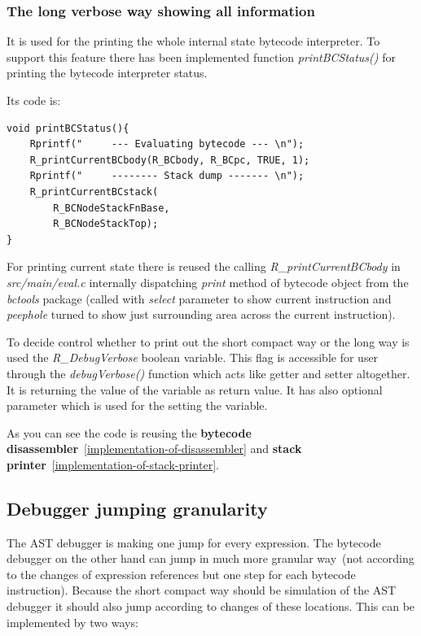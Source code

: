 \documentclass[thesis=M,english]{FITthesis}[2018/10/20]
\begin{document}
\subsubsection{The long verbose way showing all information}
It is used for the printing the whole internal state bytecode interpreter. To support this feature there has been implemented function \textit{printBCStatus()} for printing the bytecode interpreter status.

Its code is:
\begin{lstlisting}
void printBCStatus(){
    Rprintf("     --- Evaluating bytecode --- \n");
    R_printCurrentBCbody(R_BCbody, R_BCpc, TRUE, 1);
    Rprintf("     -------- Stack dump ------- \n");
    R_printCurrentBCstack(
    	R_BCNodeStackFnBase, 
    	R_BCNodeStackTop);
}
\end{lstlisting}

For printing current state there is reused the calling \textit{R{\_}printCurrentBCbody} in \textit{src/main/eval.c} internally dispatching \textit{print} method of bytecode object from the \textit{bctools} package (called with \textit{select} parameter to show current instruction and \textit{peephole} turned to show just surrounding area across the current instruction).

To decide control whether to print out the short compact way or the long way is used the \textit{R{\_}DebugVerbose} boolean variable. This flag is accessible for user through the \textit{debugVerbose()} function which acts like getter and setter altogether. It is returning the value of the variable as return value. It has also optional parameter which is used for the setting the variable. 

As you can see the code is reusing the \textbf{bytecode disassembler}~\ref{implementation-of-disassembler} and \textbf{stack printer}~\ref{implementation-of-stack-printer}.

\subsection{Debugger jumping granularity}

The AST debugger is making one jump for every expression. The bytecode debugger on the other hand can jump in much more granular way~(not according to the changes of expression references but one step for each bytecode instruction). Because the short compact way should be simulation of the AST debugger it should also jump according to changes of these locations. This can be implemented by two ways:
\end{document}
